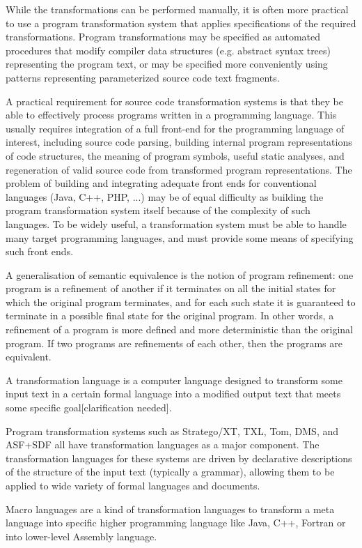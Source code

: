 While the transformations can be performed manually, it is often more practical
to use a program transformation system that applies specifications of the
required transformations. Program transformations may be specified as automated
procedures that modify compiler data structures (e.g. abstract syntax trees)
representing the program text, or may be specified more conveniently using
patterns representing parameterized source code text fragments.

A practical requirement for source code transformation systems is that they be
able to effectively process programs written in a programming language. This
usually requires integration of a full front-end for the programming language of
interest, including source code parsing, building internal program
representations of code structures, the meaning of program symbols, useful
static analyses, and regeneration of valid source code from transformed program
representations. The problem of building and integrating adequate front ends for
conventional languages (Java, C++, PHP, ...) may be of equal difficulty as
building the program transformation system itself because of the complexity of
such languages. To be widely useful, a transformation system must be able to
handle many target programming languages, and must provide some means of
specifying such front ends.

A generalisation of semantic equivalence is the notion of program refinement:
one program is a refinement of another if it terminates on all the initial
states for which the original program terminates, and for each such state it is
guaranteed to terminate in a possible final state for the original program. In
other words, a refinement of a program is more defined and more deterministic
than the original program. If two programs are refinements of each other, then
the programs are equivalent.

A transformation language is a computer language designed to transform some
input text in a certain formal language into a modified output text that meets
some specific goal[clarification needed].

Program transformation systems such as Stratego/XT, TXL, Tom, DMS, and ASF+SDF
all have transformation languages as a major component. The transformation
languages for these systems are driven by declarative descriptions of the
structure of the input text (typically a grammar), allowing them to be applied
to wide variety of formal languages and documents.

Macro languages are a kind of transformation languages to transform a meta
language into specific higher programming language like Java, C++, Fortran or
into lower-level Assembly language.

